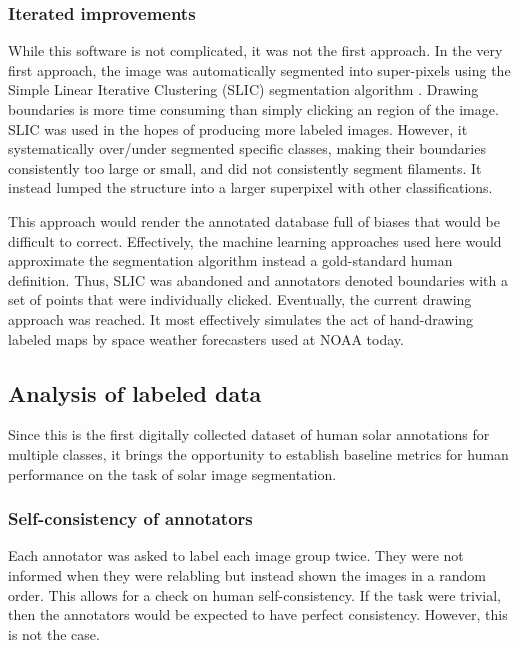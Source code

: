 \documentclass[twoside]{report}
\begin{document}
\subsubsection{Iterated improvements}
While this software is not complicated, it was not the first approach. In the very first approach, the image was automatically segmented into super-pixels using the Simple Linear Iterative Clustering (SLIC) segmentation algorithm \cite{SLIC}. Drawing boundaries is more time consuming than simply clicking an region of the image. SLIC was used in the hopes of producing more labeled images. However, it systematically over/under segmented specific classes, making their boundaries consistently too large or small, and did not consistently segment filaments. It instead lumped the structure into a larger superpixel with other classifications. 

This approach would render the annotated database full of biases that would be difficult to correct. Effectively, the machine learning approaches used here would approximate the segmentation algorithm instead a gold-standard human definition. Thus, SLIC was abandoned and annotators denoted boundaries with a set of points that were individually clicked. Eventually, the current drawing approach was reached. It most effectively simulates the act of hand-drawing labeled maps by space weather forecasters used at NOAA today. 

\subsection{Analysis of labeled data}
Since this is the first digitally collected dataset of human solar annotations for multiple classes, it brings the opportunity to establish baseline metrics for human performance on the task of solar image segmentation. 

\subsubsection{Self-consistency of annotators} \label{sec:consistency}

Each annotator was asked to label each image group twice. They were not informed when they were relabling but instead shown the images in a random order. This allows for a check on human self-consistency. If the task were trivial, then the annotators would be expected to have perfect consistency. However, this is not the case. 
\end{document}
